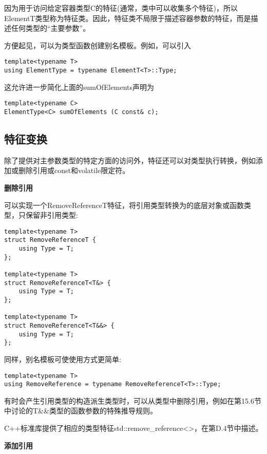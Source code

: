 因为用于访问给定容器类型C的特征(通常，类中可以收集多个特征)，所以ElementT类型称为特征类。因此，特征类不局限于描述容器参数的特征，而是描述任何类型的“主要参数”。

方便起见，可以为类型函数创建别名模板。例如，可以引入

\begin{lstlisting}[style=styleCXX]
template<typename T>
using ElementType = typename ElementT<T>::Type;
\end{lstlisting}

这允许进一步简化上面的sumOfElements声明为

\begin{lstlisting}[style=styleCXX]
template<typename C>
ElementType<C> sumOfElements (C const& c);
\end{lstlisting}

\subsection{特征变换}

除了提供对主参数类型的特定方面的访问外，特征还可以对类型执行转换，例如添加或删除引用或const和volatile限定符。

\noindent
\textbf{删除引用}

可以实现一个RemoveReferenceT特征，将引用类型转换为的底层对象或函数类型，只保留非引用类型:

\begin{lstlisting}[style=styleCXX]
template<typename T>
struct RemoveReferenceT {
	using Type = T;
};

template<typename T>
struct RemoveReferenceT<T&> {
	using Type = T;
};

template<typename T>
struct RemoveReferenceT<T&&> {
	using Type = T;
};
\end{lstlisting}

同样，别名模板可使使用方式更简单:

\begin{lstlisting}[style=styleCXX]
template<typename T>
using RemoveReference = typename RemoveReferenceT<T>::Type;
\end{lstlisting}

有时会产生引用类型的构造派生类型时，可以从类型中删除引用，例如在第15.6节中讨论的T\&\&类型的函数参数的特殊推导规则。

C++标准库提供了相应的类型特征std::remove\_reference<>，在第D.4节中描述。

\noindent
\textbf{添加引用}

